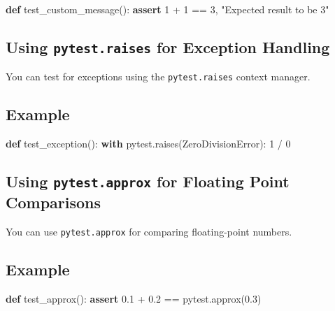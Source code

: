 \documentclass[
  letterpaper,
  DIV=11,
  numbers=noendperiod]{scrreprt}
\newenvironment{Shaded}{\begin{snugshade}}{\end{snugshade}}
\newcommand{\ControlFlowTok}[1]{\textcolor[rgb]{0.00,0.23,0.31}{\textbf{#1}}}
\newcommand{\DecValTok}[1]{\textcolor[rgb]{0.68,0.00,0.00}{#1}}
\newcommand{\FloatTok}[1]{\textcolor[rgb]{0.68,0.00,0.00}{#1}}
\newcommand{\KeywordTok}[1]{\textcolor[rgb]{0.00,0.23,0.31}{\textbf{#1}}}
\newcommand{\NormalTok}[1]{\textcolor[rgb]{0.00,0.23,0.31}{#1}}
\newcommand{\OperatorTok}[1]{\textcolor[rgb]{0.37,0.37,0.37}{#1}}
\newcommand{\PreprocessorTok}[1]{\textcolor[rgb]{0.68,0.00,0.00}{#1}}
\newcommand{\StringTok}[1]{\textcolor[rgb]{0.13,0.47,0.30}{#1}}
\begin{document}
\begin{Shaded}
\begin{Highlighting}[]
\KeywordTok{def}\NormalTok{ test\_custom\_message():}
    \ControlFlowTok{assert} \DecValTok{1} \OperatorTok{+} \DecValTok{1} \OperatorTok{==} \DecValTok{3}\NormalTok{, }\StringTok{"Expected result to be 3"}
\end{Highlighting}
\end{Shaded}

\subsection{\texorpdfstring{Using \texttt{pytest.raises} for Exception
Handling}{Using pytest.raises for Exception Handling}}\label{using-pytest.raises-for-exception-handling}

You can test for exceptions using the \texttt{pytest.raises} context
manager.

\subsection{Example}\label{example-28}

\begin{Shaded}
\begin{Highlighting}[]
\KeywordTok{def}\NormalTok{ test\_exception():}
    \ControlFlowTok{with}\NormalTok{ pytest.raises(}\PreprocessorTok{ZeroDivisionError}\NormalTok{):}
        \DecValTok{1} \OperatorTok{/} \DecValTok{0}
\end{Highlighting}
\end{Shaded}

\subsection{\texorpdfstring{Using \texttt{pytest.approx} for Floating
Point
Comparisons}{Using pytest.approx for Floating Point Comparisons}}\label{using-pytest.approx-for-floating-point-comparisons}

You can use \texttt{pytest.approx} for comparing floating-point numbers.

\subsection{Example}\label{example-29}

\begin{Shaded}
\begin{Highlighting}[]
\KeywordTok{def}\NormalTok{ test\_approx():}
    \ControlFlowTok{assert} \FloatTok{0.1} \OperatorTok{+} \FloatTok{0.2} \OperatorTok{==}\NormalTok{ pytest.approx(}\FloatTok{0.3}\NormalTok{)}
\end{Highlighting}
\end{Shaded}
\end{document}
